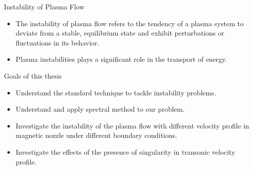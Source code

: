 \begin{frame}{Instability of Plasma Flow}
  \begin{itemize}
    \item The instability of plasma flow refers to the tendency of a plasma system to deviate from a stable, equilibrium state and exhibit perturbations or fluctuations in its behavior.
    \item Plasma instabilities plays a significant role in the transport of energy.
  \end{itemize}  
\end{frame}

\begin{frame}{Goals of this thesis}
  \begin{itemize}
    \item Understand the standard technique to tackle instability problems.
    \item Understand and apply spectral method to our problem.
    \item Investigate the instability of the plasma flow with different velocity profile in magnetic nozzle under different boundary conditions.
    \item Investigate the effects of the presence of singularity in transonic velocity profile.
  \end{itemize}  
\end{frame}
